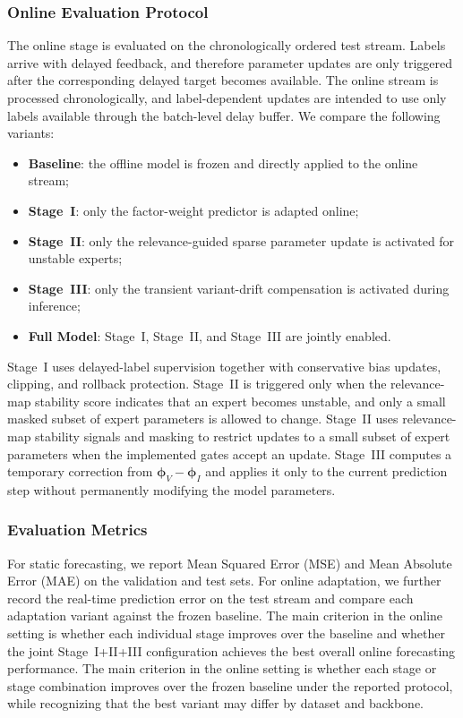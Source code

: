 ﻿\documentclass[journal]{IEEEtran}
\DeclareRobustCommand{\oldtext}[1]{{\color{revisionred}#1}}
\DeclareRobustCommand{\newtext}[1]{{\color{revisionblue}#1}}
\DeclareRobustCommand{\why}[1]{{\color{revisionblue}{\footnotesize (#1)}}}
\DeclareRobustCommand{\rw}[3]{\oldtext{#1} \newtext{#2}\why{#3}}
\begin{document}
\subsubsection{Online Evaluation Protocol}
The online stage is evaluated on the chronologically ordered test stream. \rw{Labels arrive with delayed feedback, and therefore parameter updates are only triggered after the corresponding delayed target becomes available.}{The online stream is processed chronologically, and label-dependent updates are intended to use only labels available through the batch-level delay buffer.}{与实现更一致；Stage II/Full 的严格延迟有效性仍需代码修复或重跑。} We compare the following variants:
\begin{itemize}
\item \textbf{Baseline}: the offline model is frozen and directly applied to the online stream;
\item \textbf{Stage~I}: only the factor-weight predictor is adapted online;
\item \textbf{Stage~II}: only the relevance-guided sparse parameter update is activated for unstable experts;
\item \textbf{Stage~III}: only the transient variant-drift compensation is activated during inference;
\item \textbf{Full Model}: Stage~I, Stage~II, and Stage~III are jointly enabled.
\end{itemize}

Stage~I uses delayed-label supervision together with conservative bias updates, clipping, and rollback protection. \rw{Stage~II is triggered only when the relevance-map stability score indicates that an expert becomes unstable, and only a small masked subset of expert parameters is allowed to change.}{Stage~II uses relevance-map stability signals and masking to restrict updates to a small subset of expert parameters when the implemented gates accept an update.}{避免把触发逻辑写得比实现证据更绝对。} Stage~III computes a temporary correction from $\boldsymbol{\phi}_V-\boldsymbol{\phi}_I$ and applies it only to the current prediction step without permanently modifying the model parameters.

\subsubsection{Evaluation Metrics}
For static forecasting, we report Mean Squared Error (MSE) and Mean Absolute Error (MAE) on the validation and test sets. For online adaptation, we further record the real-time prediction error on the test stream and compare each adaptation variant against the frozen baseline. \rw{The main criterion in the online setting is whether each individual stage improves over the baseline and whether the joint Stage~I+II+III configuration achieves the best overall online forecasting performance.}{The main criterion in the online setting is whether each stage or stage combination improves over the frozen baseline under the reported protocol, while recognizing that the best variant may differ by dataset and backbone.}{避免预设每个 stage 和 full controller 均优。}
\end{document}
